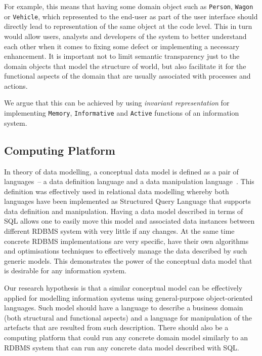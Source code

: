 \documentclass[a4paper,10pt,oneside,openright,final]{memoir} %
\begin{document}
  	For example, this means that having some domain object such as \texttt{Person}, \texttt{Wagon} or \texttt{Vehicle}, which represented to the end-user as part of the user interface should directly lead to representation of the same object at the code level.
  	This in turn would allow users, analysts and developers of the system to better understand each other when it comes to fixing some defect or implementing a necessary enhancement.
  	It is important not to limit semantic transparency just to the domain objects that model the structure of world, but also facilitate it for the functional aspects of the domain that are usually associated with processes and actions.
  
	We argue that this can be achieved by using \emph{invariant representation} for implementing \texttt{Memory}, \texttt{Informative} and \texttt{Active} functions of an information system.
  
\subsection*{Computing Platform}

	In theory of data modelling, a conceptual data model is defined as a pair of languages~-- a data definition language and a data manipulation language~\cite{kal1983}.
  	This definition was effectively used in relational data modelling whereby both languages have been implemented as Structured Query Language that supports data definition and manipulation.
  	Having a data model described in terms of SQL allows one to easily move this model and associated data instances between different RDBMS system with very little if any changes.
  	At the same time concrete RDBMS implementations are very specific, have their own algorithms and optimisations techniques to effectively manage the data described by such generic models.
  	This demonstrates the power of the conceptual data model that is desirable for any information system.
  
  Our research hypothesis is that a similar conceptual model can be effectively applied for modelling information systems using general-purpose object-oriented languages.
  Such model should have a language to describe a business domain (both structural and functional aspects) and a language for manipulation of the artefacts that are resulted from such description.
  There should also be a computing platform that could run any concrete domain model similarly to an RDBMS system that can run any concrete data model described with SQL.
  
\end{document}
